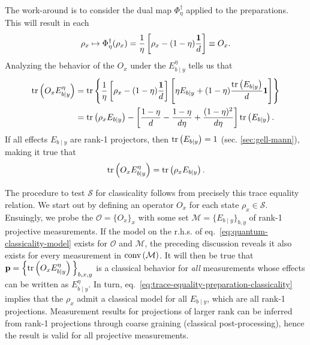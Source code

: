         The work-around is to consider the dual map $\Phi_\eta^\dagger$ applied to the preparations. This will result in each
        \begin{equation}
            \rho_x \mapsto \Phi_\eta^\dagger(\rho_x) = \frac{1}{\eta} \left[ \rho_x - (1 - \eta) \frac{\mathbf{1}}{d} \right] \equiv O_x .
            \label{eq:polarized-preparations}
        \end{equation}
        Analyzing the behavior of the $O_x$ under the $E_{b \mid y}^\eta$ tells us that
        \begin{align*}
            \text{tr}\left( O_x E_{b \mid y}^\eta \right) &= \text{tr}\left\{ \frac{1}{\eta} \left[ \rho_x - (1 - \eta) \frac{\mathbf{1}}{d} \right]  \left[ \eta E_{b \mid y} + (1 - \eta) \frac{ \text{tr}\left( E_{b \mid y} \right) }{d} \mathbf{1} \right] \right\} \\
            &= \text{tr}\left( \rho_x E_{b \mid y} \right) - \left[ \frac{1 - \eta}{d} - \frac{ 1 - \eta }{ d \eta }  + \frac{ (1 - \eta)^2 }{ d \eta } \right] \text{tr}\left( E_{b \mid y} \right).
        \end{align*}
        If all effects $E_{b \mid y}$ are rank-1 projectors, then $\text{tr}\left( E_{b \mid y} \right) = 1$ (sec. \ref{sec:gell-mann}), making it true that
        \begin{equation}
            \text{tr}\left( O_x E_{b \mid y}^\eta \right) = \text{tr}\left( \rho_x E_{b \mid y} \right).
            \label{eq:trace-equality-preparation-classicality}
        \end{equation}

        The procedure to test $\mathcal{S}$ for classicality follows from precisely this trace equality relation. We start out by defining an operator $O_x$ for each state $\rho_x \in \mathcal{S}$. Ensuingly, we probe the $\mathcal{O} = \{ O_x \}_x$ with some set $\mathcal{M} = \{ E_{b \mid y} \}_{b,y}$ of rank-1 projective measurements. If the model on the r.h.s. of eq.~\eqref{eq:quantum-classicality-model} exists for $\mathcal{O}$ and $\mathcal{M}$, the preceding discussion reveals it also exists for every measurement in $\text{conv} \left( \mathcal{M} \right)$. It will then be true that $\mathbf{p} = \Big\{ \text{tr}\left( O_x E_{b \mid y}^\eta \right) \Big\}_{b,x,y}$ is a classical behavior for \emph{all} measurements whose effects can be written as $E_{b \mid y}^\eta$. In turn, eq.~\eqref{eq:trace-equality-preparation-classicality} implies that the $\rho_x$ admit a classical model for all $E_{b \mid y}$, which are all rank-1 projections. Measurement results for projections of larger rank can be inferred from rank-1 projections through coarse graining (classical post-processing), hence the result is valid for all projective measurements.


